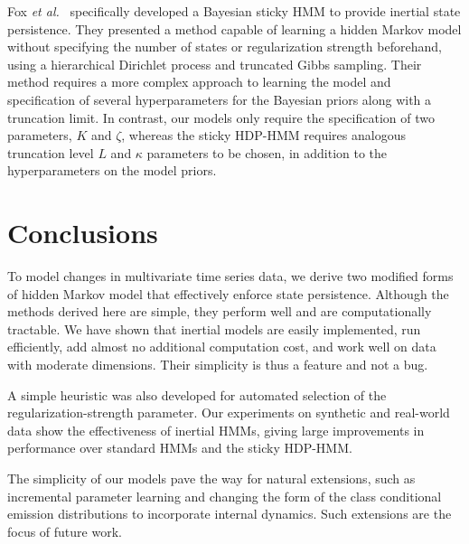\documentclass[letterpaper]{article}
\begin{document}
Fox \emph{et al.}\ \cite{fox2011sticky} specifically developed a Bayesian sticky
HMM to provide inertial state persistence. They presented a method capable of
learning a hidden Markov model without specifying the number of states or
regularization strength beforehand, using a hierarchical Dirichlet process and
truncated Gibbs sampling. Their method requires a more complex approach to
learning the model and specification of several hyperparameters for the Bayesian priors 
along with a truncation limit. In contrast, our models only require the 
specification of two parameters, $K$ and $\zeta$, whereas the
sticky HDP-HMM requires analogous truncation level $L$ and $\kappa$ parameters
to be chosen, in addition to the hyperparameters on the model priors. 

\section{Conclusions}

To model changes in multivariate time series data, we derive two modified forms of hidden Markov model that effectively enforce state persistence. Although the methods derived here are simple, they perform well and are computationally tractable. We have shown that inertial models are easily implemented, run efficiently, add almost no additional computation cost, and work well on data with moderate dimensions. Their simplicity is thus a feature and not a bug. 

A simple heuristic was also developed for automated selection of the regularization-strength parameter. Our experiments on synthetic and real-world data show the effectiveness of inertial HMMs, giving large improvements in performance over standard HMMs and the sticky HDP-HMM.

The simplicity of our models pave the way for natural extensions, such as incremental parameter learning and changing the form of the class conditional emission distributions to incorporate internal dynamics. Such extensions are the focus of future work.

\fontsize{9.5pt}{10.5pt}
\selectfont


\end{document}
